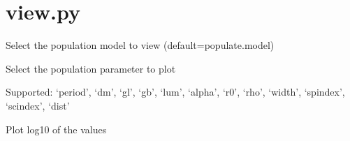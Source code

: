 \documentclass[letterpaper,10pt,english]{sphinxmanual}
\begin{document}
\section{view.py}
\label{\detokenize{cmd-line-docs:view-py}}\label{\detokenize{cmd-line-docs:view-doc}}\label{\detokenize{cmd-line-docs:view-docs}}

\begin{fulllineitems}
\label{\detokenize{cmd-line-docs:cmdoption-view.py-f}}
\pysigstartsignatures
\pysigline
{}
\pysigstopsignatures
\sphinxAtStartPar
Select the population model to view (default=populate.model)

\end{fulllineitems}


\begin{fulllineitems}
\label{\detokenize{cmd-line-docs:cmdoption-view.py-p}}
\pysigstartsignatures
\pysigline
{}
\pysigstopsignatures
\sphinxAtStartPar
Select the population parameter to plot

\sphinxAtStartPar
Supported: ‘period’, ‘dm’, ‘gl’, ‘gb’, ‘lum’, ‘alpha’, ‘r0’, ‘rho’, ‘width’, ‘spindex’, ‘scindex’, ‘dist’

\end{fulllineitems}


\begin{fulllineitems}
\label{\detokenize{cmd-line-docs:cmdoption-view.py-logx}}
\pysigstartsignatures
\pysigline
{\sphinxcode{\sphinxupquote{}}}
\pysigstopsignatures
\sphinxAtStartPar
Plot log10 of the values

\end{fulllineitems}
\end{document}
